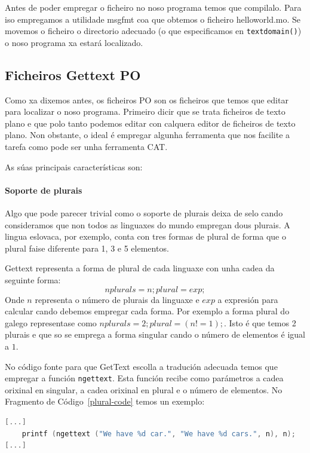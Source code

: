 Antes de poder empregar o ficheiro no noso programa temos que compilalo. Para iso empregamos a utilidade msgfmt coa que obtemos o ficheiro helloworld.mo. Se movemos o ficheiro o directorio adecuado (o que especificamos en \lstinline{textdomain()}) o noso programa xa estará localizado.

\subsection{Ficheiros Gettext PO}
Como xa dixemos antes, os ficheiros PO son os ficheiros que temos que editar para localizar o noso programa. Primeiro dicir que se trata ficheiros de texto plano e que polo tanto podemos editar con calquera editor de ficheiros de texto plano. Non obstante, o ideal é empregar algunha ferramenta que nos facilite a tarefa como pode ser unha ferramenta CAT.

As súas principais características son:

\paragraph{Soporte de plurais}
Algo que pode parecer trivial como o soporte de plurais deixa de selo cando consideramos que non todos as linguaxes do mundo empregan dous plurais. A lingua eslovaca, por exemplo, conta con tres formas de plural de forma que o plural faise diferente para 1, 3 e 5 elementos.

Gettext representa a forma de plural de cada linguaxe con unha cadea da seguinte forma: $$nplurals=n; plural=exp;$$ Onde $n$ representa o número de plurais da linguaxe e $exp$ a expresión para calcular cando debemos empregar cada forma. Por exemplo a forma plural do galego representase como $nplurals=2; plural=(n != 1);$. Isto é que temos 2 plurais e que so se emprega a forma singular cando o número de elementos é igual a $1$.

No código fonte para que GetText escolla a tradución adecuada temos que empregar a función \lstinline{ngettext}. Esta función recibe como parámetros a cadea orixinal en singular, a cadea orixinal en plural e o número de elementos. No Fragmento de Código~\ref{plural-code} temos un exemplo:

\begin{lstlisting}[label=plural-code,language=C,caption=Plurais en GetText (Código Fonte).]
[...]
    printf (ngettext ("We have %d car.", "We have %d cars.", n), n);
[...]
\end{lstlisting}

